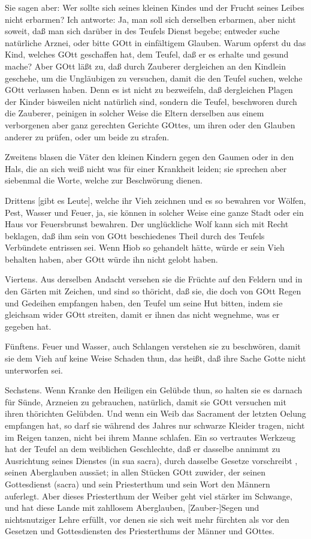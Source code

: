 Sie sagen aber: Wer sollte sich seines kleinen Kindes und der Frucht seines Leibes nicht erbarmen? Ich antworte: Ja, man soll sich derselben erbarmen, aber nicht soweit, daß man sich darüber in des Teufels Dienst begebe; entweder suche natürliche Arznei, oder bitte GOtt in einfältigem Glauben. Warum opferst du das Kind, welches GOtt geschaffen hat, dem Teufel, daß er es erhalte und gesund mache? Aber GOtt läßt zu, daß durch Zauberer dergleichen an den Kindlein geschehe, um die Ungläubigen zu versuchen, damit die den Teufel suchen, welche GOtt verlassen haben. Denn es ist nicht zu bezweifeln, daß dergleichen Plagen der Kinder bisweilen nicht natürlich sind, sondern die Teufel, beschworen durch die Zauberer, peinigen in solcher Weise die Eltern derselben aus einem verborgenen aber ganz gerechten Gerichte GOttes, um ihren oder den Glauben anderer zu prüfen, oder um beide zu strafen.

Zweitens blasen die Väter den kleinen Kindern gegen den Gaumen oder in den Hals, die an sich weiß nicht was für einer Krankheit leiden; sie sprechen aber siebenmal die Worte, welche zur Beschwörung dienen.

Drittens [gibt es Leute], welche ihr Vieh zeichnen und es so bewahren vor Wölfen, Pest, Wasser und Feuer, ja, sie können in solcher Weise eine ganze Stadt oder ein Haus vor Feuersbrunst bewahren. Der unglückliche Wolf kann sich mit Recht beklagen, daß ihm sein von GOtt beschiedenes Theil durch des Teufels Verbündete entrissen sei. Wenn Hiob so gehandelt hätte, würde er sein Vieh behalten haben, aber GOtt würde ihn nicht gelobt haben.

Viertens. Aus derselben Andacht versehen sie die Früchte auf den Feldern und in den Gärten mit Zeichen, und sind so thöricht, daß sie, die doch von GOtt Regen und Gedeihen empfangen haben, den Teufel um seine Hut bitten, indem sie gleichsam wider GOtt streiten, damit er ihnen das nicht wegnehme, was er gegeben hat.

Fünftens. Feuer und Wasser, auch Schlangen verstehen sie zu beschwören, damit sie dem Vieh auf keine Weise Schaden thun, das heißt, daß ihre Sache Gotte nicht unterworfen sei.

Sechstens. Wenn Kranke den Heiligen ein Gelübde thun, so halten sie es darnach für Sünde, Arzneien zu gebrauchen, natürlich, damit sie GOtt versuchen mit ihren thörichten Gelübden. Und wenn ein Weib das Sacrament der letzten Oelung empfangen hat, so darf sie während des Jahres nur schwarze Kleider tragen, nicht im Reigen tanzen, nicht bei ihrem Manne schlafen. Ein so vertrautes Werkzeug hat der Teufel an dem weiblichen Geschlechte, daß er dasselbe annimmt zu Ausrichtung seines Dienstes (in sua sacra), durch dasselbe Gesetze vorschreibt
, seinen Aberglauben aussäet; in allen Stücken GOtt zuwider, der seinen Gottesdienst (sacra) und sein Priesterthum und sein Wort den Männern auferlegt. Aber dieses Priesterthum der Weiber geht viel stärker im Schwange, und hat diese Lande mit zahllosem Aberglauben, [Zauber-]Segen und nichtsnutziger Lehre erfüllt, vor denen sie sich weit mehr fürchten als vor den Gesetzen und Gottesdiensten des Priesterthums der Männer und GOttes.

